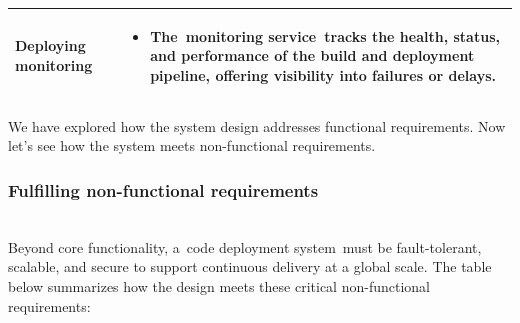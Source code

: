 \begin{table}[htbp]
{\begin{tabular}{|p{}|p{}|}
\hline
Deploying monitoring & \begin{itemize} \tightlist \item The~monitoring service~tracks the health, status, and performance of the build and deployment pipeline, offering visibility into failures or delays. \end{itemize} \\
\hline
\end{tabular}
}
\end{table}

We have explored how the system design addresses functional requirements. Now let's see how the system meets non-functional requirements.

\subsubsection{Fulfilling non-functional requirements}\label{mQNsOD33083BoznPdi-7_}
\\
Beyond core functionality, a~code deployment system~must be fault-tolerant, scalable, and secure to support continuous delivery at a global scale. The table below summarizes how the design meets these critical non-functional requirements:

